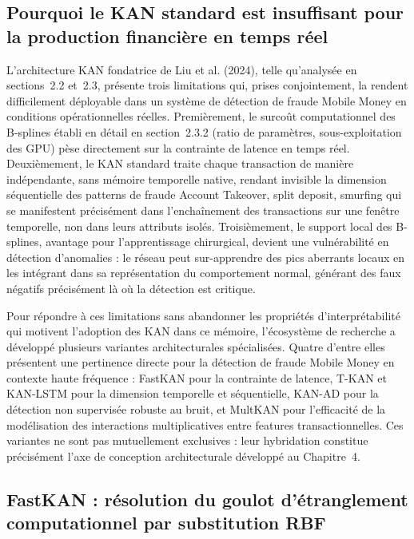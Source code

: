 \documentclass[11pt,a4paper,oneside]{report}
\theoremstyle{definition}
\theoremstyle{remark}
\begin{document}
\subsection{Pourquoi le KAN standard est insuffisant pour la production financière en temps réel}

L'architecture KAN fondatrice de Liu et al. (2024), telle qu'analysée en sections~2.2 et~2.3, présente trois limitations qui, prises conjointement, la rendent difficilement déployable dans un système de détection de fraude Mobile Money en conditions opérationnelles réelles. Premièrement, le surcoût computationnel des B-splines  établi en détail en section~2.3.2 (ratio de paramètres, sous-exploitation des GPU)  pèse directement sur la contrainte de latence en temps réel. Deuxièmement, le KAN standard traite chaque transaction de manière indépendante, sans mémoire temporelle native, rendant invisible la dimension séquentielle des patterns de fraude  Account Takeover, split deposit, smurfing  qui se manifestent précisément dans l'enchaînement des transactions sur une fenêtre temporelle, non dans leurs attributs isolés. Troisièmement, le support local des B-splines, avantage pour l'apprentissage chirurgical, devient une vulnérabilité en détection d'anomalies : le réseau peut sur-apprendre des pics aberrants locaux en les intégrant dans sa représentation du comportement normal, générant des faux négatifs précisément là où la détection est critique.

Pour répondre à ces limitations sans abandonner les propriétés d'interprétabilité qui motivent l'adoption des KAN dans ce mémoire, l'écosystème de recherche a développé plusieurs variantes architecturales spécialisées. Quatre d'entre elles présentent une pertinence directe pour la détection de fraude Mobile Money en contexte haute fréquence : FastKAN pour la contrainte de latence, T-KAN et KAN-LSTM pour la dimension temporelle et séquentielle, KAN-AD pour la détection non supervisée robuste au bruit, et MultKAN pour l'efficacité de la modélisation des interactions multiplicatives entre features transactionnelles. Ces variantes ne sont pas mutuellement exclusives : leur hybridation constitue précisément l'axe de conception architecturale développé au Chapitre~4.

\subsection{FastKAN : résolution du goulot d'étranglement computationnel par substitution RBF}
\end{document}
